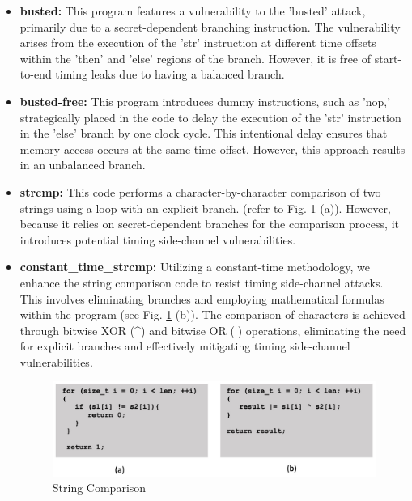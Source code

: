 \begin{itemize}
    \item \textbf{busted:} This program features a vulnerability to the 'busted' attack, primarily due to a secret-dependent branching instruction. The vulnerability arises from the execution of the 'str' instruction at different time offsets within the 'then' and 'else' regions of the branch. However, it is free of start-to-end timing leaks due to having a balanced branch.

    \item \textbf{busted-free:} This program introduces dummy instructions, such as 'nop,' strategically placed in the code to delay the execution of the 'str' instruction in the 'else' branch by one clock cycle. This intentional delay ensures that memory access occurs at the same time offset. However, this approach results in an unbalanced branch.

    \item \textbf{strcmp:} This code performs a character-by-character comparison of two strings using a loop with an explicit branch. (refer to Fig. \ref{fig:string} (a)). However, because it relies on secret-dependent branches for the comparison process, it introduces potential timing side-channel vulnerabilities.

    \item \textbf{ constant\_time\_strcmp:} Utilizing a constant-time methodology, we enhance the string comparison code to resist timing side-channel attacks. This involves eliminating branches and employing mathematical formulas within the program (see Fig. \ref{fig:string} (b)). The comparison of characters is achieved through bitwise XOR (\textasciicircum) and bitwise OR ($|$) operations, eliminating the need for explicit branches and effectively mitigating timing side-channel vulnerabilities.

 \begin{figure}
  \centering
  \includegraphics[width=\columnwidth]{figures/string.jpg}
  \caption{String Comparison}
  \label{fig:string}
\end{figure}


\end{itemize}
